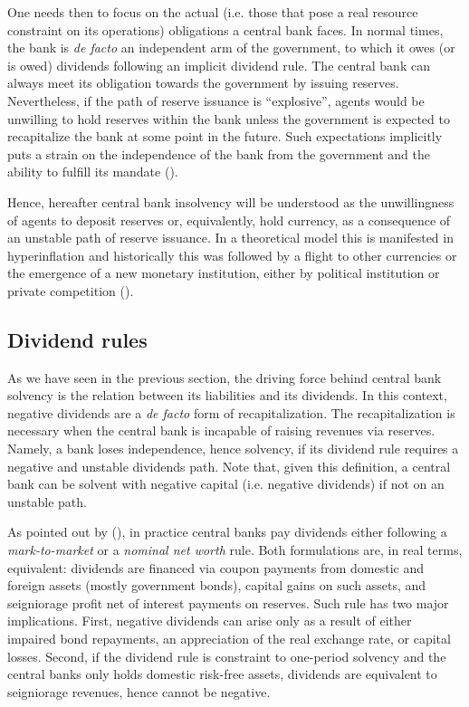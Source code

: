 \documentclass[american]{scrartcl}
\newcommand{\citein}[1]{\citeauthor{#1} (\citeyear{#1})}
\begin{document}
One needs then to focus on the actual (i.e. those that pose a real resource constraint on its operations) obligations a central bank faces. In normal times, the bank is \textit{de facto} an independent arm of the government, to which it owes (or is owed) dividends following an implicit dividend rule. The central bank can always meet its obligation towards the government by issuing reserves. Nevertheless, if the path of reserve issuance is ``explosive'', agents would be unwilling to hold reserves within the bank unless the government is expected to recapitalize the bank at some point in the future. Such expectations implicitly puts a strain on the independence of the bank from the government and the ability to fulfill its mandate (\cite{deHaan2016}).

Hence, hereafter central bank insolvency will be understood as the unwillingness of agents to deposit reserves or, equivalently, hold currency, as a consequence of an unstable path of reserve issuance. In a theoretical model this is manifested in hyperinflation and historically this was followed by a flight to other currencies or the emergence of a new monetary institution, either by political institution or private competition (\cite{Flandreau2007}). %

\subsection{Dividend rules}

As we have seen in the previous section, the driving force behind central bank solvency is the relation between its liabilities and its dividends. In this context, negative dividends are a \textit{de facto} form of recapitalization. The recapitalization is necessary when the central bank is incapable of raising revenues via reserves. Namely, a bank loses independence, hence solvency, if its dividend rule requires a negative and unstable dividends path. Note that, given this definition, a central bank can be solvent with negative capital (i.e. negative dividends) if not on an unstable path.

As pointed out by \citein{Hall2015}, in practice central banks pay dividends either following a \textit{mark-to-market} or a \textit{nominal net worth} rule. Both formulations are, in real terms, equivalent: dividends are financed via coupon payments from domestic and foreign assets (mostly government bonds), capital gains on such assets, and seigniorage profit net of interest payments on reserves. Such rule has two major implications. First, negative dividends can arise only as a result of either impaired bond repayments, an appreciation of the real exchange rate, or capital losses. Second, if the dividend rule is constraint to one-period solvency and the central banks only holds domestic risk-free assets, dividends are equivalent to seigniorage revenues, hence cannot be negative.
\end{document}

